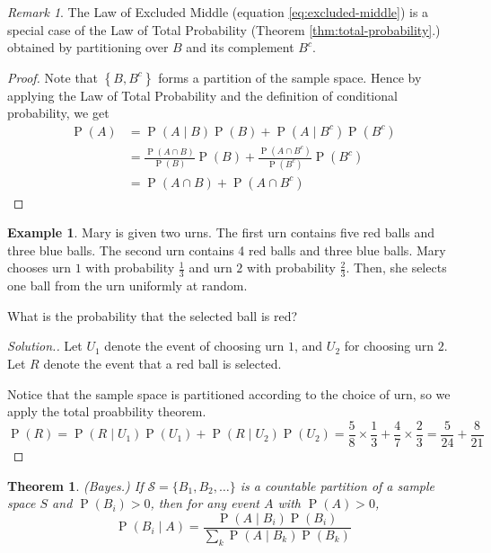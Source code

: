 \documentclass[11pt,letterpaper]{article}
\makeatletter
\newtheorem{thm}{Theorem}
\theoremstyle{definition}
\newtheorem{eg}{Example}
\theoremstyle{remark}
\newtheorem{rem}{Remark}[section]
\newenvironment{solution}{
    \let\oldqedsymbol=\qedsymbol%
    \def\@addpunct##1{}%
    \renewcommand{\qedsymbol}{$\blacktriangleleft$}%
    \begin{proof}[\textit Solution.]
}{
    \end{proof}%
    \renewcommand{\qedsymbol}{\oldqedsymbol}
}
\newcommand{\parens}[1]{\left(#1\right)}
\newcommand{\setof}[1]{\left\{#1\right\}}
\newcommand{\intersn}{\cap}
\newcommand{\given}{\;\vert\;}
\DeclareMathOperator{\Prob}{P}
\renewcommand{\P}[1]{\Prob{\parens{#1}}}
\makeatother
\begin{document}
\begin{rem}
    The Law of Excluded Middle (equation \ref{eq:excluded-middle}) is a special
    case of the Law of Total Probability (Theorem \ref{thm:total-probability}.)
    obtained by partitioning over $B$ and its complement $B^c$.
\end{rem}

\begin{proof}
    Note that $\setof{B, B^c}$ forms a partition of the sample space. Hence by
    applying the Law of Total Probability and the definition of conditional
    probability, we get
    \begin{align*}
        \P{A}
        &= \P{A \given B} \P{B} + \P{A \given B^c} \P{B^c} \\
        &= \frac{\P{A \intersn B}}{\P{B}} \P{B}
            + \frac{\P{A \intersn B^c}}{\P{B^c}} \P{B^c} \\
        &= \P{A \intersn B} + \P{A \intersn B^c}
    \end{align*}
\end{proof}

\begin{eg}
    \label{eg:marys-urns}
    Mary is given two urns. The first urn contains five red balls and three
    blue balls. The second urn contains 4 red balls and three blue balls. Mary
    chooses urn $1$ with probability $\frac{1}{3}$ and urn $2$ with probability
    $\frac{2}{3}$. Then, she selects one ball from the urn uniformly at random.

    What is the probability that the selected ball is red?
\end{eg}

\begin{solution}
    Let $U_1$ denote the event of choosing urn $1$, and $U_2$ for choosing urn
    $2$. Let $R$ denote the event that a red ball is selected.

    Notice that the sample space is partitioned according to the choice of urn,
    so we apply the total proabbility theorem.
    \begin{equation*}
        \P{R}
        = \P{R \given U_1}\P{U_1} + \P{R \given U_2}\P{U_2}
        = \frac{5}{8} \times \frac{1}{3} + \frac{4}{7} \times \frac{2}{3}
        = \frac{5}{24} + \frac{8}{21}
    \end{equation*}
\end{solution}

\begin{thm}{(Bayes.)}
    \label{thm:bayes}
    If $\mathcal{S} = \{B_1, B_2, \ldots\}$ is a countable partition of a
    sample space $S$ and $\P{B_i} > 0$, then for any event $A$ with
    $\P{A} > 0$,
    \begin{equation}
        \label{eq:bayes}
        \P{B_i \given A}
        = \frac{\P{A \given B_i}\P{B_i}}{\sum_{k} \P{A \given B_k} \P{B_k}}
    \end{equation}
\end{thm}
\end{document}
